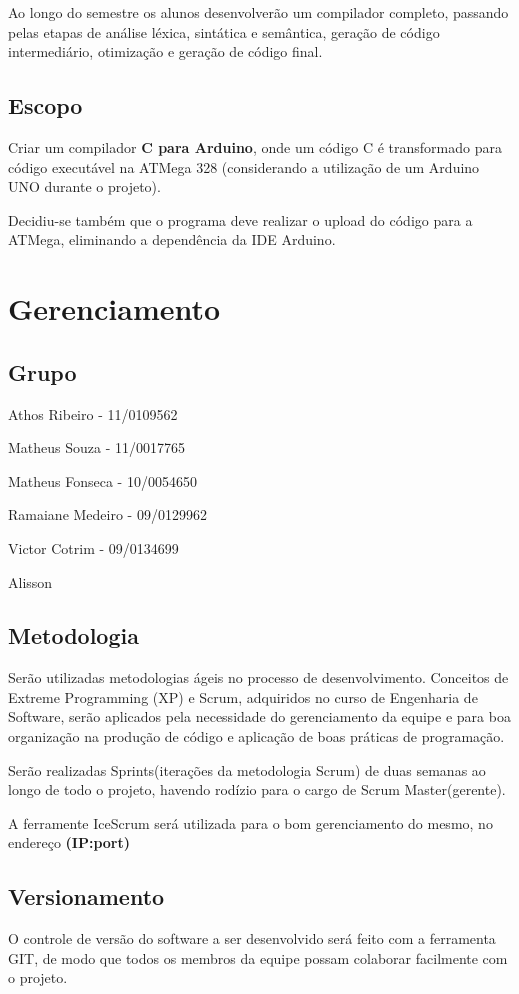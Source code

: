 \documentclass{abnt}
\begin{document}
    Ao longo do semestre os alunos desenvolverão um compilador completo, passando pelas etapas de análise léxica, sintática e semântica, geração de código intermediário, otimização e geração de código final.
    \section{Escopo}
Criar um compilador \textbf{C para Arduino}, onde um código C é transformado para código executável na ATMega 328 (considerando a utilização de um Arduino UNO durante o projeto).

Decidiu-se também que o programa deve realizar o upload do código para a ATMega, eliminando a dependência da IDE Arduino.

\chapter{Gerenciamento}
\section{Grupo}
    Athos Ribeiro - 11/0109562

    Matheus Souza - 11/0017765

    Matheus Fonseca - 10/0054650

    Ramaiane Medeiro - 09/0129962

    Victor Cotrim - 09/0134699

    Alisson

\section{Metodologia}
Serão utilizadas metodologias ágeis no processo de desenvolvimento. Conceitos de Extreme Programming (XP) e Scrum, adquiridos no curso de Engenharia de Software, serão aplicados  pela necessidade do gerenciamento da equipe e para boa organização na produção de código e aplicação de boas práticas de programação.

Serão realizadas Sprints(iterações da metodologia Scrum) de duas semanas ao longo de todo o projeto, havendo rodízio para o cargo de Scrum Master(gerente).

A ferramente IceScrum será utilizada para o bom gerenciamento do mesmo, no endereço \textbf{(IP:port)}
\section{Versionamento}
O controle de versão do software a ser desenvolvido será feito com a ferramenta GIT, de modo que todos os membros da equipe possam colaborar facilmente com o projeto.
\end{document}
